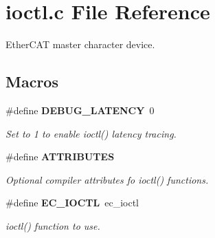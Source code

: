 \section{ioctl.\-c File Reference}
\label{ioctl_8c}


Ether\-C\-A\-T master character device.  


\subsection*{Macros}
\begin{DoxyCompactItemize}
\item 
\#define {\bf D\-E\-B\-U\-G\-\_\-\-L\-A\-T\-E\-N\-C\-Y}~0
\begin{DoxyCompactList}\small\item\em Set to 1 to enable ioctl() latency tracing. \end{DoxyCompactList}\item 
\#define {\bf A\-T\-T\-R\-I\-B\-U\-T\-E\-S}\label{ioctl_8c_ae456bc7dfd6c3d54bccef2e234ecae7a}

\begin{DoxyCompactList}\small\item\em Optional compiler attributes fo ioctl() functions. \end{DoxyCompactList}\item 
\#define {\bf E\-C\-\_\-\-I\-O\-C\-T\-L}~ec\-\_\-ioctl\label{ioctl_8c_a80a51dad3458ecb73d12369fa9b50a02}

\begin{DoxyCompactList}\small\item\em ioctl() function to use. \end{DoxyCompactList}\end{DoxyCompactItemize}
